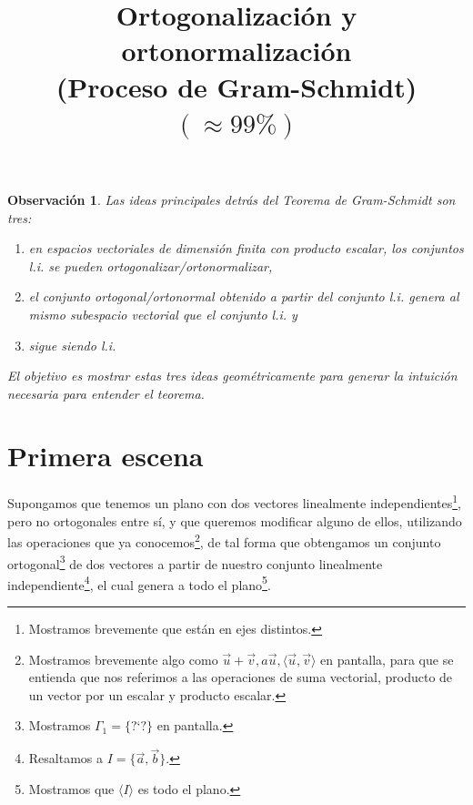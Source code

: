 \documentclass[12pt,dvipsnames]{article}
\newtheorem{obs}{Observación}[section]
\numberwithin{equation}{section}
\begin{document}
\title{Ortogonalización y ortonormalización \\ (Proceso de Gram-Schmidt) \\ $(\approx 99\%)$}
\date{}
\maketitle

\begin{obs}

Las ideas principales detrás del Teorema de Gram-Schmidt son tres:
\begin{enumerate}[label=(\roman*)]
    
    \item en espacios vectoriales de dimensión finita con producto escalar, los conjuntos l.i. se pueden ortogonalizar/ortonormalizar,
    
    \item el conjunto ortogonal/ortonormal obtenido a partir del conjunto l.i. genera al mismo subespacio vectorial que el conjunto l.i. y
    
    \item sigue siendo l.i.
\end{enumerate}

El objetivo es mostrar estas tres ideas geométricamente para generar la intuición necesaria para entender el teorema.
\end{obs}

\newpage
\section{Primera escena}

Supongamos que tenemos un plano con dos vectores linealmente independientes\footnote{Mostramos brevemente que están en ejes distintos.}, pero no ortogonales entre sí, y que queremos modificar alguno de ellos, utilizando las operaciones que ya conocemos\footnote{Mostramos brevemente algo como $\vec{u}+\vec{v}, a\vec{u}, \langle\vec{u},\vec{v}\rangle$ en pantalla, para que se entienda que nos referimos a las operaciones de suma vectorial, producto de un vector por un escalar y producto escalar.}, de tal forma que obtengamos un conjunto ortogonal\footnote{Mostramos $\Gamma_1=\{ \text{?`} ? \}$ en pantalla.} de dos vectores a partir de nuestro conjunto linealmente independiente\footnote{Resaltamos a $I=\{\vec{a},\vec{b}\}$.}, el cual genera a todo el plano\footnote{Mostramos que $\langle I\rangle$ es todo el plano.}.
\end{document}
